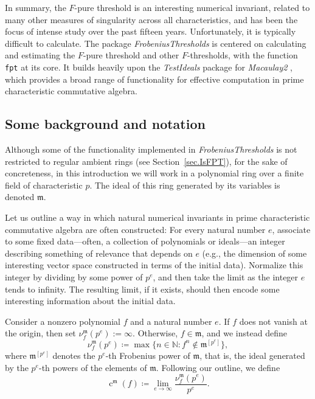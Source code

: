 \documentclass{amsart}
\newcommand{\ft}{\operatorname{c}}
\newcommand{\idealm}{\mathfrak{m}}
\begin{document}
In summary,  the $F$-pure threshold is an interesting numerical invariant, related to many other measures of singularity across all characteristics, and has been the focus of intense study over the past fifteen years.
Unfortunately, it is typically difficult to calculate.
The package \emph{FrobeniusThresholds} is centered on calculating and estimating the $F$-pure threshold and other $F$-thresholds, with the function \texttt{fpt} at its core.
It builds heavily upon the \emph{TestIdeals} package for \emph{Macaulay2} \cite{TestIdealsPackage, TestIdealsPaper}, which provides a broad range of functionality for effective computation in prime characteristic commutative algebra.

\subsection{Some background and notation}
Although some of the functionality implemented in \emph{FrobeniusThresholds} is not restricted to regular ambient rings (see Section~\ref{sec.IsFPT}), for the sake of concreteness, in this introduction  we will work in a polynomial ring over a finite field of  characteristic $p$.
The ideal of this ring generated by its variables is denoted $\idealm$.

Let us outline a way in which natural numerical invariants in prime characteristic commutative algebra are often constructed:  For every natural number $e$, associate to some fixed data---often, a collection of polynomials or ideals---an integer describing something of relevance that depends on $e$ (e.g., the dimension of some interesting vector space constructed in terms of the initial data).
Normalize this integer by dividing by some power of $p^e$, and then take the limit as the integer $e$ tends to infinity.
The resulting limit, if it exists, should then encode some interesting information about the initial data.

Consider a nonzero polynomial $f$ and a natural number $e$.  If $f$ does not vanish at the origin, then set $\nu_f^{\idealm}(p^e) := \infty$.  Otherwise, $f \in \idealm$, and we instead define
\[ \nu_f^{\idealm}(p^e) \coloneqq  \max \{ n \in \mathbb{N} : f^n \notin \idealm^{[p^e]} \}, \]
where $\idealm^{[p^e]}$ denotes the $p^e$-th Frobenius power of $\idealm$, that is, the ideal generated by the $p^e$-th powers of the elements of $\idealm$.
Following our outline, we define
\[ \ft^{\idealm}(f) \coloneqq  \lim_{e \to \infty} \frac{ \nu_f^{\idealm}(p^e)}{p^e}. \]
\end{document}
